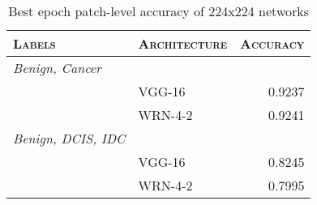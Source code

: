 
\begin{table}[h]
\renewcommand{\arraystretch}{1.1}
\caption{Best epoch patch-level accuracy of 224x224 networks}
\label{table_results_224}
\centering
\begin{tabular}{|llr|}
\hline
\textsc{Labels}&\textsc{Architecture}&\textsc{Accuracy}\\
\hline
\textit{Benign, Cancer}&&\\
&VGG-16&  0.9237\\
&WRN-4-2& 0.9241\\
\hline
\textit{Benign, DCIS, IDC}&&\\
&VGG-16& 0.8245\\
&WRN-4-2& 0.7995\\
\hline
\end{tabular}
\end{table}

